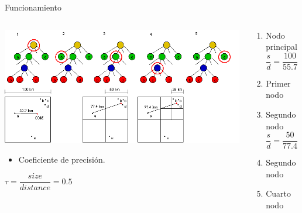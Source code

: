\documentclass[handout]{beamer}
\begin{document}
\begin{frame}{Funcionamiento}
	\begin{columns}
		\begin{column}{0.6\textwidth}
			\centering
			\includegraphics[width=\linewidth]{sources/images/force.png}\\
			\begin{itemize}
				\item Coeficiente de precisi\'on.
			\end{itemize}
			$\tau = \dfrac{size}{distance} = 0.5$
			\pause
		\vspace{1cm}
		
		\end{column}
		\begin{column}{0.4\textwidth}
			\begin{enumerate}
				\footnotesize
				\item {\color{orange} Nodo principal} \pause
				\begin{equation*}
					\dfrac{s}{d} = \dfrac{100}{55.7} \approx 1.8 > \tau 
				\end{equation*}
				\pause
				\item {\color{green} Primer nodo} \pause
				\item {\color{green} Segundo nodo} \pause
				\begin{equation*}
					\dfrac{s}{d} = \dfrac{50}{77.4} \approx 0.6 > \tau
				\end{equation*}
				\pause
				\item {\color{blue} Segundo nodo} \pause
				\pause
				\item {\color{green} Cuarto nodo} \pause
			\end{enumerate}
		\end{column}
	\end{columns}
\end{frame}
\end{document}
